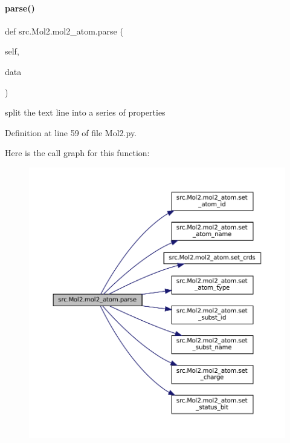 \paragraph{\texorpdfstring{parse()}{parse()}}
{\footnotesize\ttfamily def src.\+Mol2.\+mol2\+\_\+atom.\+parse (\begin{DoxyParamCaption}\item[{}]{self,  }\item[{}]{data }\end{DoxyParamCaption})}



split the text line into a series of properties 



Definition at line 59 of file Mol2.\+py.

Here is the call graph for this function\+:
\nopagebreak
\begin{figure}[H]
\begin{center}
\leavevmode
\includegraphics[width=350pt]{classsrc_1_1Mol2_1_1mol2__atom_ae32d7dfab8bcae5050d7129037dbc94c_cgraph}
\end{center}
\end{figure}
\mbox{\label{classsrc_1_1Mol2_1_1mol2__atom_a25cff4aebd3f1f50ae4946602a47467e}} 
